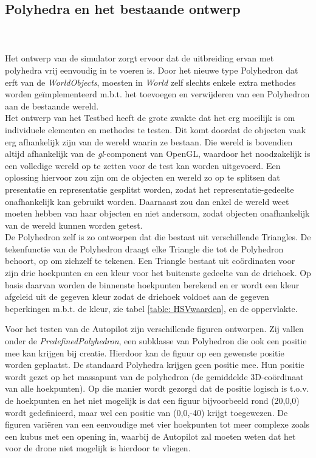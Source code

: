 \subsection{Polyhedra en het bestaande ontwerp}
\\\\
Het ontwerp van de simulator zorgt ervoor dat de uitbreiding ervan met polyhedra vrij eenvoudig in te voeren is. Door het nieuwe type Polyhedron dat erft van de \textit{WorldObjects}, moesten in \textit{World} zelf slechts enkele extra methodes worden ge\"implementeerd m.b.t. het toevoegen en verwijderen van een Polyhedron aan de bestaande wereld.\\
\noindent
Het ontwerp van het Testbed heeft de grote zwakte dat het erg moeilijk is om individuele elementen en methodes te testen. Dit komt doordat de objecten vaak erg afhankelijk zijn van de wereld waarin ze bestaan. Die wereld is bovendien altijd afhankelijk van de \textit{gl}-component van OpenGL, waardoor het noodzakelijk is een volledige wereld op te zetten voor de test kan worden uitgevoerd. Een oplossing hiervoor zou zijn om de objecten en wereld zo op te splitsen dat presentatie en representatie gesplitst worden, zodat het representatie-gedeelte onafhankelijk kan gebruikt worden. Daarnaast zou dan enkel de wereld weet moeten hebben van haar objecten en niet andersom, zodat objecten onafhankelijk van de wereld kunnen worden getest.\\

\noindent 
De Polyhedron zelf is zo ontworpen dat die bestaat uit verschillende Triangles. De tekenfunctie van de Polyhedron draagt elke Triangle die tot de Polyhedron behoort, op om zichzelf te tekenen. Een Triangle bestaat uit co\"ordinaten voor zijn drie hoekpunten en een kleur voor het buitenste gedeelte van de driehoek. Op basis daarvan worden de binnenste hoekpunten berekend en er wordt een kleur afgeleid uit de gegeven kleur zodat de driehoek voldoet aan de gegeven beperkingen m.b.t. de kleur, zie tabel \ref{table: HSVwaarden}, en de oppervlakte.\\

\noindent

Voor het testen van de Autopilot zijn verschillende figuren ontworpen. Zij vallen onder de \textit{PredefinedPolyhedron}, een subklasse van Polyhedron die ook een positie mee kan krijgen bij creatie. Hierdoor kan de figuur op een gewenste positie worden geplaatst. De standaard Polyhedra krijgen geen positie mee. Hun positie wordt gezet op het massapunt van de polyhedron (de gemiddelde 3D-co\"ordinaat van alle hoekpunten). Op die manier wordt gezorgd dat de positie logisch is t.o.v. de hoekpunten en het niet mogelijk is dat een figuur bijvoorbeeld rond (20,0,0) wordt gedefinieerd, maar wel een positie van (0,0,-40) krijgt toegewezen. De figuren vari\"eren van een eenvoudige met vier hoekpunten tot meer complexe zoals een kubus met een opening in, waarbij de Autopilot zal moeten weten dat het voor de drone niet mogelijk is hierdoor te vliegen.

